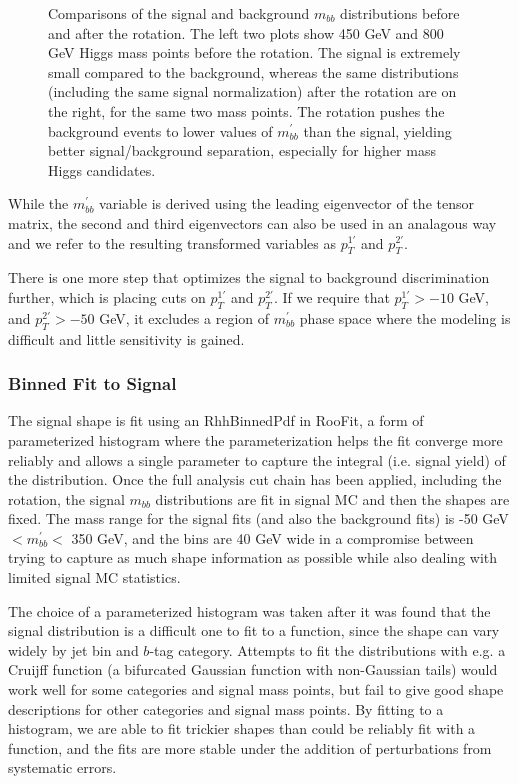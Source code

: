 \begin{figure}[hbt]
\caption{ Comparisons of the signal and background $m_{bb}$ distributions
    before and after the rotation.  The left two plots show 450 GeV and 800 GeV
    Higgs mass points before the rotation. The signal is extremely small compared to the background, whereas the 
    same distributions (including the same signal normalization) after the rotation
    are on the right, for the same two mass points.  The rotation pushes the
    background events to lower values of $m_{bb}^{'}$ than the signal, yielding
    better signal/background separation, especially for higher mass Higgs candidates.
     \label{fig:transformed_vars}}
\end{figure}


While the $m_{bb}^{'}$ variable is derived using the leading eigenvector of the
tensor matrix, the second and third eigenvectors can also be used in an analagous
way and we refer to the resulting transformed variables as $p_T^{1'}$ and $p_{T}^{2'}$.


There is one more step that optimizes the signal to background
discrimination further, which is placing cuts on $p_T^{1'}$ and $p_T^{2'}$.
If we require that $p_T^{1'}>-10$ GeV, and $p_T^{2'}>-50$ GeV, it 
excludes a region of $m_{bb}^{'}$ phase space where the modeling is difficult
and little sensitivity is gained.  








\subsubsection{Binned Fit to Signal}

The signal shape is fit using an RhhBinnedPdf in RooFit, a form of parameterized
histogram where the parameterization helps the fit converge more reliably and allows
a single parameter to capture the integral (i.e. signal yield) of the distribution.
Once the full analysis cut chain has been applied, including the rotation, the 
signal $m_{bb}$ distributions are fit in signal MC and then the shapes are fixed.
The mass range for the signal fits (and also the background fits) is -50 GeV $< m_{bb}^{'}<$ 350 GeV,
and the bins are 40 GeV wide in a compromise between trying to capture as much
shape information as possible while also dealing with limited signal MC statistics.

The choice of a parameterized histogram was taken after it was found that 
the signal distribution is a difficult one to fit to a function, since the shape can vary
widely by jet bin and $b$-tag category.  Attempts to fit the distributions with e.g. a 
Cruijff function (a bifurcated Gaussian function with non-Gaussian tails) would work
well for some categories and signal mass points, but fail to give good shape descriptions
for other categories and signal mass points.  By fitting to a histogram, we are able
to fit trickier shapes than could be reliably fit with a function, and the fits are
more stable under the addition of perturbations from systematic errors.


